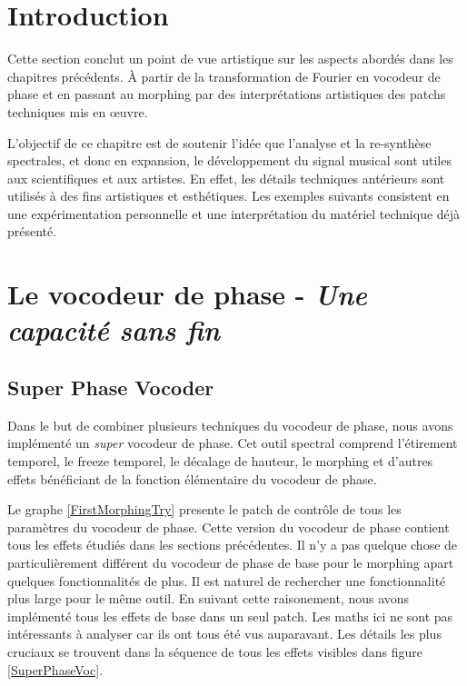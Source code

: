
\label{ch:Implémentations aristiques}

\section{Introduction}

Cette section conclut un point de vue artistique sur les aspects abordés dans les chapitres précédents. À partir de la transformation de Fourier en vocodeur de phase et en passant au morphing par des interprétations artistiques des patchs techniques mis en œuvre.

L'objectif de ce chapitre est de soutenir l'idée que l'analyse et la re-synthèse spectrales, et donc en expansion, le développement du signal musical  sont utiles aux scientifiques et aux artistes. En effet, les détails techniques antérieurs sont utilisés à des fins artistiques et esthétiques. Les exemples suivants consistent en une expérimentation personnelle et une interprétation du matériel technique déjà présenté.

\section{Le vocodeur de phase - \textit{Une capacité sans fin}}

\subsection{Super Phase Vocoder}

Dans le but de combiner plusieurs techniques du vocodeur de phase, nous avons implémenté un \guillemotleft \textit{super} vocodeur de phase\guillemotright . Cet outil spectral comprend l'étirement temporel, le freeze temporel, le décalage de hauteur, le morphing et d'autres effets bénéficiant de la fonction élémentaire du vocodeur de phase.

Le graphe \ref{FirstMorphingTry} presente le patch de contrôle de tous les paramètres du vocodeur de phase. Cette version du vocodeur de phase contient tous les effets étudiés dans les sections précédentes. Il n'y a pas quelque chose de particulièrement différent du vocodeur de phase de base pour le morphing apart quelques fonctionnalités de plus. Il est naturel de rechercher une fonctionnalité plus large pour le même outil. En suivant cette raisonement, nous avons implémenté tous les effets de base dans un seul patch. Les maths ici ne sont pas intéressants à analyser car ils ont tous été vus auparavant. Les détails les plus cruciaux se trouvent dans la séquence de tous les effets visibles dans figure \ref{SuperPhaseVoc}.

